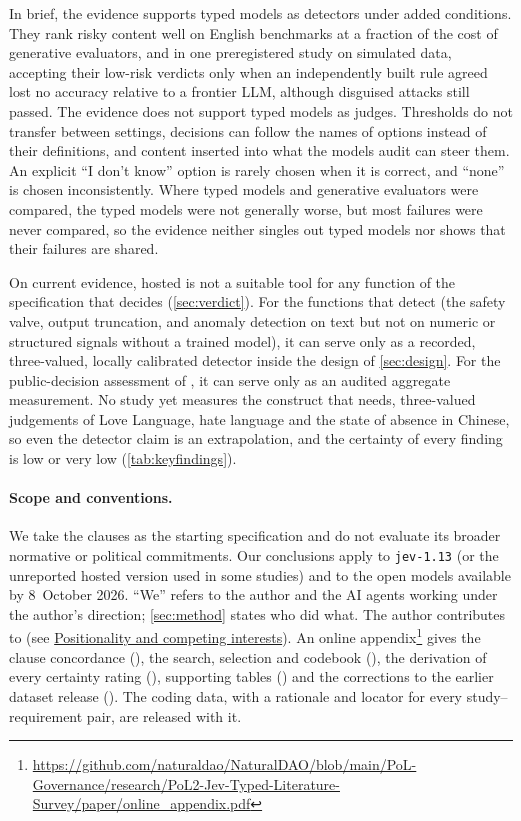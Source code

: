 In brief, the evidence supports typed models as detectors under added conditions.
They rank risky content well on English benchmarks at a fraction of the cost of generative evaluators, and in one preregistered study on simulated data, accepting their low-risk verdicts only when an independently built rule agreed lost no accuracy relative to a frontier LLM, although disguised attacks still passed.
The evidence does not support typed models as judges.
Thresholds do not transfer between settings, decisions can follow the names of options instead of their definitions, and content inserted into what the models audit can steer them.
An explicit ``I don't know'' option is rarely chosen when it is correct, and ``none'' is chosen inconsistently.
Where typed models and generative evaluators were compared, the typed models were not generally worse, but most failures were never compared, so the evidence neither singles out typed models nor shows that their failures are shared.

On current evidence, hosted \jev{} is not a suitable tool for any function of the specification that decides (\cref{sec:verdict}).
For the functions that detect (the safety valve, output truncation, and anomaly detection on text but not on numeric or structured signals without a trained model), it can serve only as a recorded, three-valued, locally calibrated detector inside the design of \cref{sec:design}.
For the public-decision assessment of , it can serve only as an audited aggregate measurement.
No study yet measures the construct that \pol{} needs, three-valued judgements of Love Language, hate language and the state of absence in Chinese, so even the detector claim is an extrapolation, and the certainty of every finding is low or very low (\cref{tab:keyfindings}).

\paragraph{Scope and conventions.}
We take the \pol{} clauses as the starting specification and do not evaluate its broader normative or political commitments.
Our conclusions apply to \texttt{jev-1.13} (or the unreported hosted version used in some studies) and to the open models available by 8~October 2026.
``We'' refers to the author and the AI agents working under the author's direction; \cref{sec:method} states who did what.
The author contributes to \pol{} (see \hyperref[sec:statements]{Positionality and competing interests}).
An online appendix\footnote{\url{https://github.com/naturaldao/NaturalDAO/blob/main/PoL-Governance/research/PoL2-Jev-Typed-Literature-Survey/paper/online_appendix.pdf}} gives the clause concordance (), the search, selection and codebook (), the derivation of every certainty rating (), supporting tables () and the corrections to the earlier dataset release ().
The coding data, with a rationale and locator for every study--requirement pair, are released with it.

